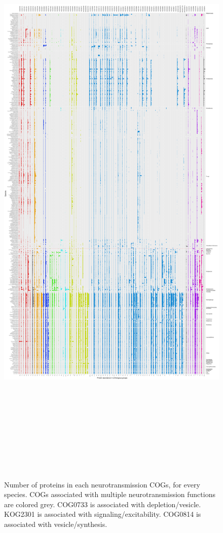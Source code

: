\clearpage

\thispagestyle{empty}


\pdfpagewidth=20.8in \pdfpageheight=36.8in

\begin{figure}[p]

\caption{Number of proteins in each neurotransmission COGs, for every species. COGs associated with multiple neurotransmission functions are colored grey. COG0733 is associated with depletion/vesicle. KOG2301 is associated with signaling/excitability. COG0814 is associated with vesicle/synthesis.}\label{fig:all_abundances}

{\centering  \includegraphics[height=35in, width=20in]{figs/analysis.abundance.all_abundances-1} }

\end{figure}

\clearpage

\restoregeometry

\pdfpagewidth=8.5in \pdfpageheight=11in
